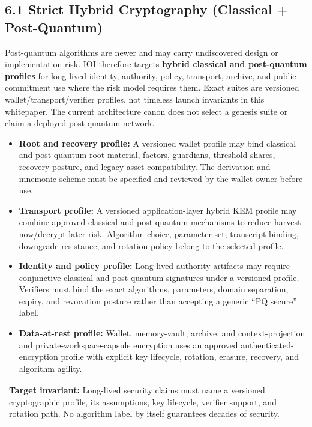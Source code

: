 \documentclass[
  11pt,
]{article}
\providecommand{\tightlist}{%
  \setlength{\itemsep}{0pt}\setlength{\parskip}{0pt}}
\begin{document}
\hypertarget{strict-hybrid-cryptography-classical-post-quantum}{%
\subsection{6.1 Strict Hybrid Cryptography (Classical +
Post-Quantum)}\label{strict-hybrid-cryptography-classical-post-quantum}}

Post-quantum algorithms are newer and may carry undiscovered design or
implementation risk. IOI therefore targets \textbf{hybrid classical and
post-quantum profiles} for long-lived identity, authority, policy,
transport, archive, and public-commitment use where the risk model requires
them. Exact suites are versioned wallet/transport/verifier profiles, not
timeless launch invariants in this whitepaper. The current architecture
canon does not select a genesis suite or claim a deployed post-quantum
network.

\begin{itemize}
\tightlist
\item
  \textbf{Root and recovery profile:} A versioned wallet profile may bind
  classical and post-quantum root material, factors, guardians, threshold
  shares, recovery posture, and legacy-asset compatibility. The derivation
  and mnemonic scheme must be specified and reviewed by the wallet owner
  before use.
\item
  \textbf{Transport profile:} A versioned application-layer hybrid KEM
  profile may combine approved classical and post-quantum mechanisms to
  reduce harvest-now/decrypt-later risk. Algorithm choice, parameter set,
  transcript binding, downgrade resistance, and rotation policy belong to
  the selected profile.
\item
  \textbf{Identity and policy profile:} Long-lived authority artifacts may
  require conjunctive classical and post-quantum signatures under a
  versioned profile. Verifiers must bind the exact algorithms, parameters,
  domain separation, expiry, and revocation posture rather than accepting a
  generic ``PQ secure'' label.
\item
  \textbf{Data-at-rest profile:} Wallet, memory-vault, archive, and
  context-projection and private-workspace-capsule encryption uses an approved
  authenticated-encryption profile
  with explicit key lifecycle, rotation, erasure, recovery, and algorithm
  agility.
\end{itemize}

\begin{longtable}[]{@{}>{\raggedright\arraybackslash}p{\linewidth}@{}}
\toprule\noalign{}
 \\
\midrule\noalign{}
\endhead
\bottomrule\noalign{}
\endlastfoot
\textbf{Target invariant:}\emph{\textbf{ }}Long-lived security claims
must name a versioned cryptographic profile, its assumptions, key lifecycle,
verifier support, and rotation path. No algorithm label by itself guarantees
decades of security. \\
\end{longtable}
\end{document}
